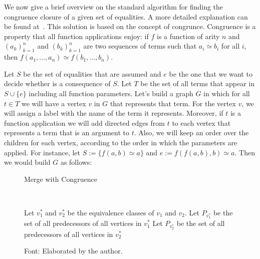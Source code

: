 We now give a brief overview on the standard algorithm for finding the congruence closure of a given set of equalities. A more detailed explanation can be found at~\cite{orig_cong_clos}. This solution is based on the concept of congrunce.
Congruence is a property that all function applications enjoy:
if $f$ is a function of arity $n$ and ${(a_{k})}_{k = 1}^{n}$ and ${(b_{k})}_{k = 1}^{n}$ are two sequences of terms such that $a_{i} \simeq b_{i}$ for all $i$, then
$f(a_{1}, \ldots, a_{n}) \simeq f(b_{1}, \ldots, b_{n})$.


Let $S$ be the set of equalities that are assumed and $e$ be the one that we want to decide whether is a consequence of $S$. Let $T$ be the set of all terms that appear in $S \cup \{e\}$ including all function parameters. Let's build a graph $G$ in which for all $t \in T$ we will have a vertex $v$ in $G$ that represents that term. For the vertex $v$, we will assign a label with the name of the term it represents. Moreover, if $t$ is a function application we will add directed edges from $t$ to each vertex that represents a term that is an argument to $t$. Also, we will keep an order over the children for each vertex, according to the order in which the parameters are applied. For instance, let $S := \{f(a, b) \simeq a\}$ and $e := f(f(a, b), b) \simeq a$. Then we would build $G$ as follows:

\renewcommand{\algorithmicforall}{\textbf{for each}}
\MakeRobust{\Call}

\begin{figure}[t]
\caption{Merge with Congruence}~\label{merge_cong}
\begin{algorithmic}[1]
    \State Let $v_{1}^{*}$ and $v_{2}^{*}$ be the equivalence classes of $v_{1}$ and $v_{2}$.
    \State Let $P_{v_{1}^{*}}$ be the set of all predecessors of all vertices in $v_{1}^{*}$
    \State Let $P_{v_{2}^{*}}$ be the set of all predecessors of all vertices in $v_{2}^{*}$
    \State{}
        \State {}
      \EndIf
    \EndFor
  \EndIf
  \EndProcedure
\end{algorithmic}
\caption*{Font: Elaborated by the author.}
\end{figure}

